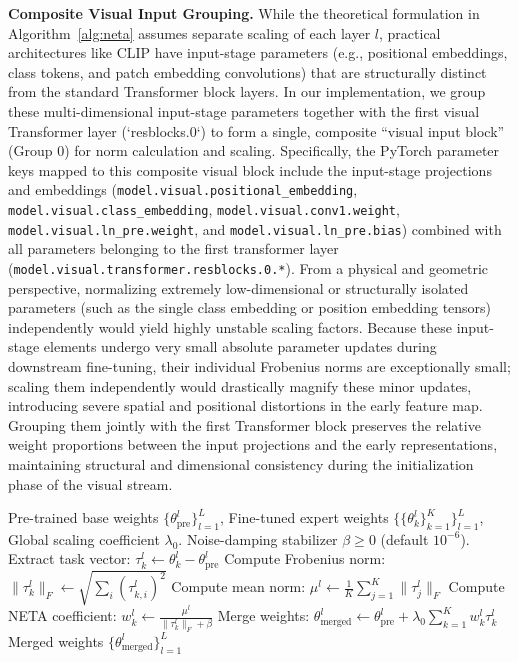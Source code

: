 \textbf{Composite Visual Input Grouping.} While the theoretical formulation in Algorithm~\ref{alg:neta} assumes separate scaling of each layer $l$, practical architectures like CLIP have input-stage parameters (e.g., positional embeddings, class tokens, and patch embedding convolutions) that are structurally distinct from the standard Transformer block layers. In our implementation, we group these multi-dimensional input-stage parameters together with the first visual Transformer layer (`resblocks.0`) to form a single, composite ``visual input block'' (Group 0) for norm calculation and scaling. Specifically, the PyTorch parameter keys mapped to this composite visual block include the input-stage projections and embeddings (\texttt{model.visual.positional\_embedding}, \texttt{model.visual.class\_embedding}, \texttt{model.visual.conv1.weight}, \texttt{model.visual.ln\_pre.weight}, and \texttt{model.visual.ln\_pre.bias}) combined with all parameters belonging to the first transformer layer (\texttt{model.visual.transformer.resblocks.0.*}). From a physical and geometric perspective, normalizing extremely low-dimensional or structurally isolated parameters (such as the single class embedding or position embedding tensors) independently would yield highly unstable scaling factors. Because these input-stage elements undergo very small absolute parameter updates during downstream fine-tuning, their individual Frobenius norms are exceptionally small; scaling them independently would drastically magnify these minor updates, introducing severe spatial and positional distortions in the early feature map. Grouping them jointly with the first Transformer block preserves the relative weight proportions between the input projections and the early representations, maintaining structural and dimensional consistency during the initialization phase of the visual stream.

\begin{algorithm}[tb]
\caption{Norm-Equalized Task Arithmetic (NETA)}
\label{alg:neta}
\begin{algorithmic}[1]
 Pre-trained base weights $\{\theta_{\text{pre}}^l\}_{l=1}^L$, Fine-tuned expert weights $\{\{\theta_k^l\}_{k=1}^K\}_{l=1}^L$, Global scaling coefficient $\lambda_0$.
 Noise-damping stabilizer $\beta \ge 0$ (default $10^{-6}$).
        \STATE Extract task vector: $\tau_k^l \leftarrow \theta_k^l - \theta_{\text{pre}}^l$
        \STATE Compute Frobenius norm: $\|\tau_k^l\|_F \leftarrow \sqrt{\sum_i (\tau_{k, i}^l)^2}$
    \ENDFOR
    \STATE Compute mean norm: $\mu^l \leftarrow \frac{1}{K} \sum_{j=1}^K \|\tau_j^l\|_F$
        \STATE Compute NETA coefficient: $w_k^l \leftarrow \frac{\mu^l}{\|\tau_k^l\|_F + \beta}$
    \ENDFOR
    \STATE Merge weights: $\theta_{\text{merged}}^l \leftarrow \theta_{\text{pre}}^l + \lambda_0 \sum_{k=1}^K w_k^l \tau_k^l$
\ENDFOR
{} Merged weights $\{\theta_{\text{merged}}^l\}_{l=1}^L$
\end{algorithmic}
\end{algorithm}

